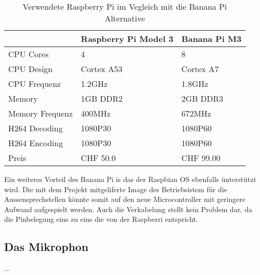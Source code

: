 \begin{table}[]     
	\centering
	\label{my-label}
	\begin{tabular}{l|ll}
		\multicolumn{1}{r|}{} & Raspberry Pi Model 3 & Banana Pi M3 \\ \hline
		CPU Cores             & 4                    & 8            \\ \hline
		CPU Design            & Cortex A53           & Cortex A7    \\ \hline
		CPU Frequenz          & 1.2GHz               & 1.8GHz       \\ \hline
		Memory                & 1GB DDR2             & 2GB DDR3     \\ \hline
		Memory Frequenz       & 400MHz               & 672MHz       \\ \hline
		H264 Decoding         & 1080P30              & 1080P60      \\ \hline
		H264 Encoding         & 1080P30              & 1080P60      \\ \hline
		Preis				  & CHF 50.0             & CHF 99.00    \\ \hline
	\end{tabular}
	\caption{Verwendete Raspberry Pi im Vegleich mit die Banana Pi Alternative}
	\label{tbl:microcontrollerComparison}
\end{table}

Ein weiteres Vorteil des Banana Pi is das der Raspbian OS ebenfalls ünterstützt wird. Die mit dem Projekt mitgeliferte Image des Betriebsistem für die Aussensprechstellen könnte somit auf den neue Microcontroller mit geringere Aufwand aufgespielt werden. Auch die Verkabelung stellt kein Problem dar, da die Pinbelegung eins zu eins die von der Raspberri entspricht.

\subsection{Das Mikrophon}
...
\\

\newpage